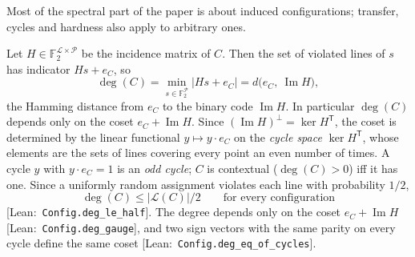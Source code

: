 \documentclass[a4paper,onecolumn,11pt,unpublished,nopdfoutputerror]{quantumarticle}
\theoremstyle{definition}
\newcommand{\leanin}[1]{{\footnotesize\color{leangreen}[\textsf{Lean}:~\texttt{#1}]}}
\newcommand{\F}{\mathbb{F}_2}
\renewcommand{\deg}{\operatorname{deg}}
\newcommand{\Lines}{\mathcal{L}}
\newcommand{\Pts}{\mathcal{P}}
\newcommand{\im}{\operatorname{Im}}
\begin{document}
Most of the spectral part of the paper is about induced configurations; transfer, cycles and hardness also apply
to arbitrary ones.

Let $H\in\F^{\Lines\times\Pts}$ be the incidence matrix of $C$. Then the set of violated lines of $s$ has
indicator $Hs+e_C$, so
\begin{equation}\label{eq:coset}
  \deg(C)=\min_{s\in\F^{\Pts}}|Hs+e_C|=d\bigl(e_C,\ \im H\bigr),
\end{equation}
the Hamming distance from $e_C$ to the binary code $\im H$. In particular $\deg(C)$ depends only on the coset
$e_C+\im H$. Since $(\im H)^\perp=\ker H^{\mathsf T}$, the coset is determined by the linear functional
$y\mapsto y\cdot e_C$ on the \emph{cycle space} $\ker H^{\mathsf T}$, whose elements are the sets of lines covering
every point an even number of times. A cycle $y$ with $y\cdot e_C=1$ is an \emph{odd cycle}; $C$ is contextual
($\deg(C)>0$) iff it has one. Since a uniformly random assignment violates each line with probability $1/2$,
\begin{equation}\label{eq:half}
\deg(C)\le|\Lines(C)|/2\qquad\text{for every configuration}
\end{equation}
\leanin{Config.deg\_le\_half}. The degree depends only on the coset $e_C+\im H$ \leanin{Config.deg\_gauge}, and two
sign vectors with the same parity on every cycle define the same coset
\leanin{Config.deg\_eq\_of\_cycles}.
\end{document}
